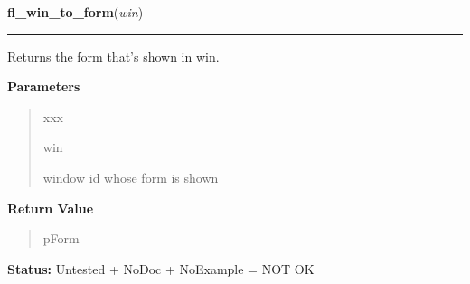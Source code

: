 \hspace{.8\funcindent}\begin{boxedminipage}{\funcwidth}

    \raggedright \textbf{fl\_win\_to\_form}(\textit{win})

    \vspace{-1.5ex}

    \rule{\textwidth}{0.5\fboxrule}
\setlength{\parskip}{2ex}
    Returns the form that's shown in win.

\setlength{\parskip}{1ex}
      \textbf{Parameters}
      \vspace{-1ex}

      \begin{quote}
        \begin{Ventry}{xxx}

          \item[win]

          window id whose form is shown

        \end{Ventry}

      \end{quote}

      \textbf{Return Value}
    \vspace{-1ex}

      \begin{quote}
      pForm

      \end{quote}

\textbf{Status:} Untested + NoDoc + NoExample = NOT OK



    \end{boxedminipage}

    \label{xformslib:library:fl_set_form_icon}

    \vspace{0.5ex}

